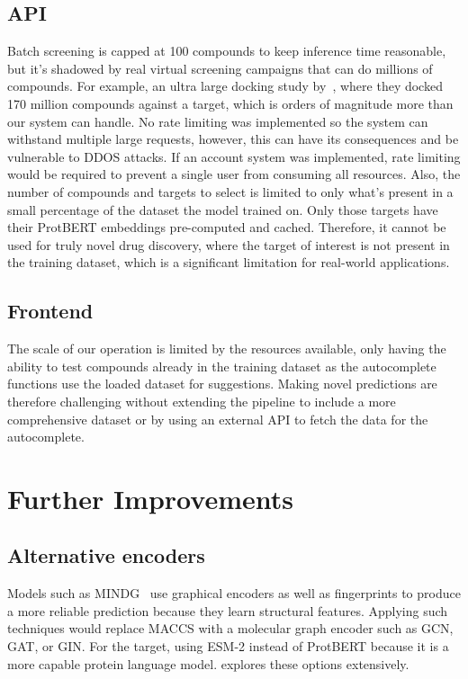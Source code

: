 \subsection{API}
Batch screening is capped at 100 compounds to keep inference time reasonable, but it's shadowed by real virtual screening campaigns that can do millions of compounds.
For example, an ultra large docking study by~\citet{lyu2019ultra}, where they docked 170 million compounds against a target, which is orders of magnitude more than our system can handle.
No rate limiting was implemented so the system can withstand multiple large requests, however, this can have its consequences and be vulnerable to DDOS attacks.
If an account system was implemented, rate limiting would be required to prevent a single user from consuming all resources.
Also, the number of compounds and targets to select is limited to only what's present in a small percentage of the dataset the model trained on.
Only those targets have their ProtBERT embeddings pre-computed and cached.
Therefore, it cannot be used for truly novel drug discovery, where the target of interest is not present in the training dataset, which is a significant limitation for real-world applications.
\subsection{Frontend}
The scale of our operation is limited by the resources available, only having the ability to test compounds already in the training dataset as the autocomplete functions use the loaded dataset for suggestions.
Making novel predictions are therefore challenging without extending the pipeline to include a more comprehensive dataset or by using an external API to fetch the data for the autocomplete.


\section{Further Improvements}
\label{sec:further-improvements}

\subsection{Alternative encoders}
\label{subsec:alternative-encoders}
Models such as MINDG~\citep{Yang2024} use graphical encoders as well as fingerprints to produce a more reliable prediction because they learn structural features.
Applying such techniques would replace MACCS with a molecular graph encoder such as GCN, GAT, or GIN.
For the target, using ESM-2 instead of ProtBERT because it is a more capable protein language model.
\citet{Vefghi2025} explores these options extensively.
